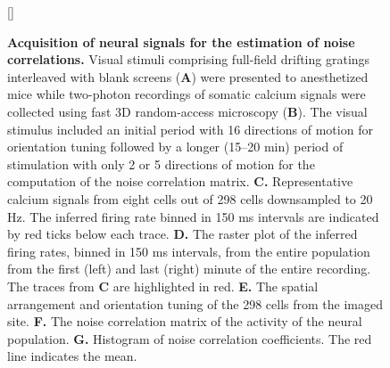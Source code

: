 \documentclass[10pt]{article}
\begin{document}
\begin{figure}    [\FBwidth]
    {\caption{{\bf Acquisition of neural signals for the estimation of noise correlations.}
    Visual stimuli comprising full-field drifting gratings interleaved with blank screens ({\bf A}) were presented to anesthetized mice while two-photon recordings of somatic calcium signals were collected using fast 3D random-access microscopy ({\bf B}). The visual stimulus included an initial period with 16 directions of motion for orientation tuning followed by a longer (15--20 min) period of stimulation with only 2 or 5 directions of motion for the computation of the noise correlation matrix. 
    {\bf C.} Representative calcium signals from eight cells out of 298 cells downsampled to 20 Hz. The inferred firing rate binned in 150 ms intervals are indicated by red ticks below each trace.
    {\bf D.} The raster plot of the inferred firing rates, binned in 150 ms intervals, from the entire population from the first (left) and last (right) minute of the entire recording.  The traces from {\bf C} are highlighted in red.
    {\bf E.} The spatial arrangement and orientation tuning of the 298 cells from the imaged site.
    {\bf F.} The noise correlation matrix of the activity of the neural population. 
    {\bf G.} Histogram of noise correlation coefficients. The red line indicates the mean.
} \label{fig:03}}

\end{figure}
\end{document}
